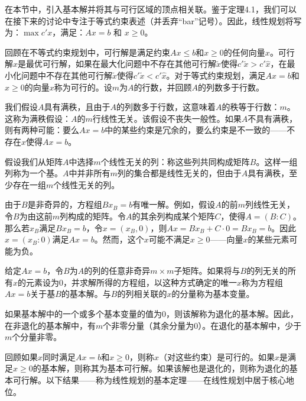 \begin{translation}
在本节中，引入基本解并将其与可行区域的顶点相关联。鉴于定理4.1，我们可以在接下来的讨论中专注于等式约束表述（并丢弃``bar''记号）。因此，线性规划将写为：$\max c' x$，满足：$Ax = b$ 和 $x \ge 0$。

回顾在不等式约束规划中，可行解是满足约束$Ax \le b$和$x \ge 0$的任何向量$x$。可行解$\hat{x}$是最优可行解，如果在最大化问题中不存在其他可行解$\tilde{x}$使得$c'\tilde{x} > c'\hat{x}$，在最小化问题中不存在其他可行解$\tilde{x}$使得$c'\tilde{x} < c'\hat{x}$。对于等式约束规划，满足$Ax = b$和$x \ge 0$的向量$x$称为可行的。设$m$为$A$的行数，并回顾$A$的列数多于行数。

我们假设$A$具有满秩，且由于$A$的列数多于行数，这意味着$A$的秩等于行数：$m$。这称为满秩假设：$A$的$m$行线性无关。该假设不丧失一般性。如果$A$不具有满秩，则有两种可能：要么$Ax = b$中的某些约束是冗余的，要么约束是不一致的——不存在$x$使得$Ax = b$。

假设我们从矩阵$A$中选择$m$个线性无关的列：称这些列共同构成矩阵$B$。这样一组列称为一个基。$A$中并非所有$m$列的集合都是线性无关的，但由于$A$具有满秩，至少存在一组$m$个线性无关的列。

由于$B$是非奇异的，方程组$Bx_B = b$有唯一解。例如，假设$A$的前$m$列线性无关，令$B$为由这前$m$列构成的矩阵。令$A$的其余列构成某个矩阵$C$，使得$A = (B : C)$。那么若$x_B$满足$Bx_B = b$，令$x = (x_B, 0)$，则$Ax = Bx_B + C \cdot 0 = Bx_B = b$。因此$x = (x_B : 0)$满足$Ax = b$。然而，这个$x$可能不满足$x \ge 0$——向量$x$的某些元素可能为负。

给定$Ax = b$，令$B$为$A$的列的任意非奇异$m \times m$子矩阵。如果将与$B$的列无关的所有$x$的元素设为0，并求解所得的方程组，以这种方式确定的唯一$x$称为方程组$Ax = b$关于基$B$的基本解。与$B$的列相关联的$x$的分量称为基本变量。

如果基本解中的一个或多个基本变量的值为0，则该解称为退化的基本解。因此，在非退化的基本解中，有$m$个非零分量（其余分量为0）。在退化的基本解中，少于$m$个分量非零。

回顾如果$x$同时满足$Ax = b$和$x \ge 0$，则称$x$（对这些约束）是可行的。如果$x$是满足$x \ge 0$的基本解，则称其为基本可行解。如果该解也是退化的，则称为退化的基本可行解。以下结果——称为线性规划的基本定理——在线性规划中居于核心地位。
\end{translation}

